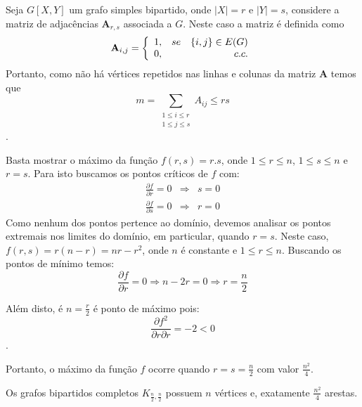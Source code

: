 
 Seja $G[X,Y]$ um grafo simples bipartido, onde $|X| = r$ e $|Y| = s$, considere a matriz de adjacências {\bf A}$_{r,s}$ associada a $G$.
%
Neste caso a matriz é definida como $${\bf A}_{i,j} = \left\{ \begin{array}{lr} 1, & se\quad\{i,j\} \in E(G) \\ 0, & c. c. \end{array}\right.$$
%
Portanto, como não há vértices repetidos nas linhas e colunas da matriz {\bf A} temos que $$m = \sum_{\substack{1 \le i \le r \\ 1 \le j \le s}} A_{ij} \le rs$$.
\fimprova

 Basta mostrar o máximo da função $f(r,s) = r.s$, onde $1 \le r \le n$, $1 \le s \le n$ e $r = s$.
%
Para isto buscamos os pontos críticos de $f$ com: 
\begin{eqnarray}
	\frac{\partial f}{\partial r} = 0 &\Rightarrow& s = 0 \nonumber\\
	\frac{\partial f}{\partial s} = 0 &\Rightarrow& r = 0 \nonumber
\end{eqnarray}
Como nenhum dos pontos pertence ao domínio, devemos analisar os pontos extremais nos limites do domínio, em particular, quando $r = s$.
%
Neste caso, $f(r,s) = r(n - r) = nr - r^2$, onde $n$ é constante e $1 \le r \le n$.
%
Buscando os pontos de mínimo temos: $$\frac{\partial f}{\partial r} = 0 \Rightarrow n - 2r = 0 \Rightarrow r = \frac{n}{2}$$

Além disto, é $n = \frac{r}{2}$ é ponto de máximo pois: $$\frac{\partial f^2}{\partial r\partial r} = -2 < 0$$.

Portanto, o máximo da função $f$ ocorre quando $r = s = \frac{n}{2}$ com valor $\frac{n^2}{4}$.
\fimprova

 Os grafos bipartidos completos $K_{\frac{n}{2},\frac{n}{2}}$ possuem $n$ vértices e, exatamente $\frac{n^2}{4}$ arestas.

